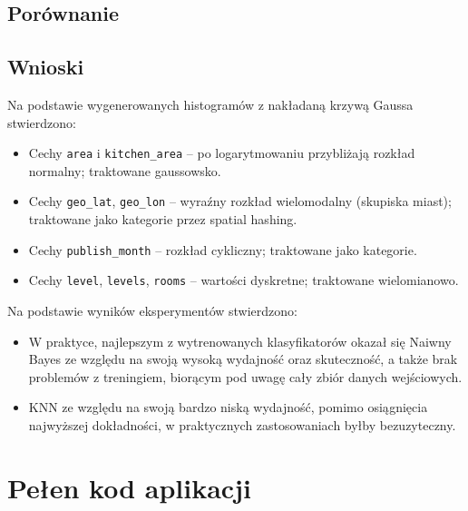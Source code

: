 \documentclass[12pt,a4paper]{article}
\begin{document}
	
	\newpage
	\subsection*{Porównanie}

	\newpage
	\subsection{Wnioski}

	Na podstawie wygenerowanych histogramów z nakładaną krzywą Gaussa stwierdzono:
	\begin{itemize}
		\item Cechy \texttt{area} i \texttt{kitchen\_area} -- po logarytmowaniu przybliżają rozkład normalny; traktowane gaussowsko.
		\item Cechy \texttt{geo\_lat}, \texttt{geo\_lon} -- wyraźny rozkład wielomodalny (skupiska miast); traktowane jako kategorie przez spatial hashing.
		\item Cechy \texttt{publish\_month} -- rozkład cykliczny; traktowane jako kategorie.
		\item Cechy \texttt{level}, \texttt{levels}, \texttt{rooms} -- wartości dyskretne; traktowane wielomianowo.
	\end{itemize}
	
	Na podstawie wyników eksperymentów stwierdzono:
	\begin{itemize}
		\item W praktyce, najlepszym z wytrenowanych klasyfikatorów okazał się Naiwny Bayes ze względu na swoją wysoką wydajność oraz skuteczność, a także brak problemów z treningiem, biorącym pod uwagę cały zbiór danych wejściowych.
		\item KNN ze względu na swoją bardzo niską wydajność, pomimo osiągnięcia najwyższej dokładności, w praktycznych zastosowaniach byłby bezuzyteczny.
	\end{itemize}

	\newpage

	\section*{Pełen kod aplikacji}
	
\end{document}
